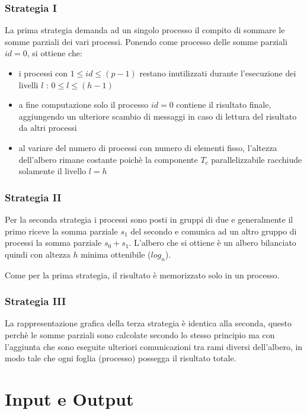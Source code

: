\documentclass[a4paper,11pt]{book}
\begin{document}
\subsection{Strategia I}
La prima strategia demanda ad un singolo processo il compito di sommare le somme parziali dei vari processi. Ponendo come processo delle somme parziali $id = 0$, si ottiene che:
\begin{itemize}
    \item i processi con $1 \leq id \leq (p-1)$ restano inutilizzati durante l'esecuzione dei livelli $l$ : $ 0 \leq l \leq (h-1)$
    \item a fine computazione solo il processo $id = 0$ contiene il risultato finale, aggiungendo un ulteriore scambio di messaggi in caso di lettura del risultato da altri processi
    \item al variare del numero di processi con numero di elementi fisso, l'altezza dell'albero rimane costante poichè la componente $T_c$ parallelizzabile racchiude solamente il livello $l=h$
\end{itemize}

\subsection{Strategia II}
Per la seconda strategia i processi sono posti in gruppi di due e generalmente il primo riceve la somma parziale $s_1$ del secondo e comunica ad un altro gruppo di processi la somma parziale $s_0 + s_1$. L'albero che si ottiene è un albero bilanciato quindi con altezza $h$ minima ottenibile ($log_n$).\par 
Come per la prima strategia, il risultato è memorizzato solo in un processo.
\subsection{Strategia III} 
La rappresentazione grafica della terza strategia è identica alla seconda, questo perchè le somme parziali sono calcolate secondo lo stesso principio ma con l'aggiunta che sono eseguite ulteriori comunicazioni tra rami diversi dell'albero, in modo tale che ogni foglia (processo) possegga il risultato totale. 


\chapter{Input e Output}
\end{document}
